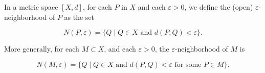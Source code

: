 In a metric space $[X, d]$, for each $P$ in $X$ and each $\varepsilon > 0$, we define the (open) $\varepsilon$-neighborhood of $P$ as the set

$$N(P, \varepsilon) = \{Q \mid Q \in X \text{ and } d(P, Q) < \varepsilon\}.$$

More generally, for each $M \subset X$, and each $\varepsilon > 0$, the $\varepsilon$-neighborhood of $M$ is

$$N(M, \varepsilon) = \{Q \mid Q \in X \text{ and } d(P, Q) < \varepsilon \text{ for some } P \in M\}.$$
